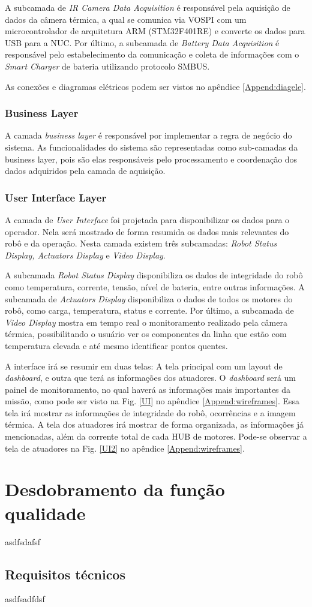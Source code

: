 A subcamada de \textit{IR Camera Data Acquisition} é responsável pela aquisição de dados da câmera térmica, a qual se comunica via VOSPI com um microcontrolador de arquitetura ARM (STM32F401RE) e converte os dados para USB para a NUC. 
Por último, a subcamada de \textit{Battery Data Acquisition} é responsável pelo estabelecimento da comunicação e coleta de informações com o \textit{Smart Charger} de bateria utilizando protocolo SMBUS.

As conexões e diagramas elétricos podem ser vistos no apêndice \ref{Append:diagele}.

\subsubsection{Business Layer}

A camada \textit{business layer} é responsável por implementar a regra de negócio do sistema. As funcionalidades do sistema são representadas como sub-camadas da business layer, pois são elas responsáveis pelo processamento e coordenação dos dados adquiridos pela camada de aquisição.

\subsubsection{User Interface Layer}

A camada de \textit{User Interface} foi projetada para disponibilizar os dados para o operador. Nela será mostrado de forma resumida os dados mais relevantes do robô e da operação. Nesta camada existem três subcamadas: \textit{Robot Status Display, Actuators Display} e \textit{Video Display}. 

A subcamada \textit{Robot Status Display} disponibiliza os dados de integridade do robô como temperatura, corrente, tensão, nível de bateria, entre outras informações. A subcamada de \textit{Actuators Display} disponibiliza o dados de todos os motores do robô, como carga, temperatura, status e corrente. Por último, a subcamada de \textit{Video Display} mostra em tempo real o monitoramento realizado pela câmera térmica, possibilitando o usuário ver os componentes da linha que estão com temperatura elevada e até mesmo identificar pontos quentes.

A interface irá se resumir em duas telas: A tela principal com um layout de \textit{dashboard}, e outra que terá as informações dos atuadores. O \textit{dashboard} será um painel de monitoramento, no qual haverá as informações mais importantes da missão, como pode ser visto na Fig. \ref{UI} no apêndice \ref{Append:wireframes}. Essa tela irá mostrar as informações de integridade do robô, ocorrências e a imagem térmica. A tela dos atuadores irá mostrar de forma organizada, as informações já mencionadas, além da corrente total de cada HUB de motores. Pode-se observar a tela de atuadores na Fig. \ref{UI2} no apêndice \ref{Append:wireframes}.



\section{Desdobramento da função qualidade}
\label{sec:qfd}
asdfsdafsf

\subsection{Requisitos técnicos}
\label{ssec:reqt}
asdfsadfdsf

